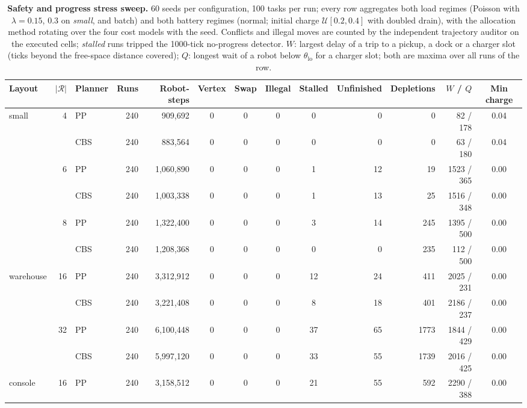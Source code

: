 \begin{table}[t]
\centering
\caption{\textbf{Safety and progress stress sweep.} 60 seeds per configuration, 100 tasks per run; every row aggregates both load regimes (Poisson with $\lambda{=}0.15$, $0.3$ on \emph{small}, and batch) and both battery regimes (normal; initial charge $\mathcal{U}[0.2,0.4]$ with doubled drain), with the allocation method rotating over the four cost models with the seed. Conflicts and illegal moves are counted by the independent trajectory auditor on the executed cells; \emph{stalled} runs tripped the 1000-tick no-progress detector. $W$: largest delay of a trip to a pickup, a dock or a charger slot (ticks beyond the free-space distance covered); $Q$: longest wait of a robot below $\theta_{\mathrm{lo}}$ for a charger slot; both are maxima over all runs of the row.}
\label{tab:stress}
\scriptsize
\setlength{\tabcolsep}{2.8pt}
\begin{tabular}{lrlrrccccrrrc}
\toprule
\textbf{Layout} & $|\mathcal{R}|$ & \textbf{Planner} & \textbf{Runs} & \textbf{Robot-steps} & \textbf{Vertex} & \textbf{Swap} & \textbf{Illegal} & \textbf{Stalled} & \textbf{Unfinished} & \textbf{Depletions} & $W$ / $Q$ & \textbf{Min charge}\\
\midrule
small & 4 & PP & 240 & 909{,}692 & 0 & 0 & 0 & 0 & 0 & 0 & 82 / 178 & 0.04\\
 &  & CBS & 240 & 883{,}564 & 0 & 0 & 0 & 0 & 0 & 0 & 63 / 180 & 0.04\\
 & 6 & PP & 240 & 1{,}060{,}890 & 0 & 0 & 0 & 1 & 12 & 19 & 1523 / 365 & 0.00\\
 &  & CBS & 240 & 1{,}003{,}338 & 0 & 0 & 0 & 1 & 13 & 25 & 1516 / 348 & 0.00\\
 & 8 & PP & 240 & 1{,}322{,}400 & 0 & 0 & 0 & 3 & 14 & 245 & 1395 / 500 & 0.00\\
 &  & CBS & 240 & 1{,}208{,}368 & 0 & 0 & 0 & 0 & 0 & 235 & 112 / 500 & 0.00\\
\midrule
warehouse & 16 & PP & 240 & 3{,}312{,}912 & 0 & 0 & 0 & 12 & 24 & 411 & 2025 / 231 & 0.00\\
 &  & CBS & 240 & 3{,}221{,}408 & 0 & 0 & 0 & 8 & 18 & 401 & 2186 / 237 & 0.00\\
 & 32 & PP & 240 & 6{,}100{,}448 & 0 & 0 & 0 & 37 & 65 & 1773 & 1844 / 429 & 0.00\\
 &  & CBS & 240 & 5{,}997{,}120 & 0 & 0 & 0 & 33 & 55 & 1739 & 2016 / 425 & 0.00\\
\midrule
console & 16 & PP & 240 & 3{,}158{,}512 & 0 & 0 & 0 & 21 & 55 & 592 & 2290 / 388 & 0.00\\

\end{tabular}
\end{table}
